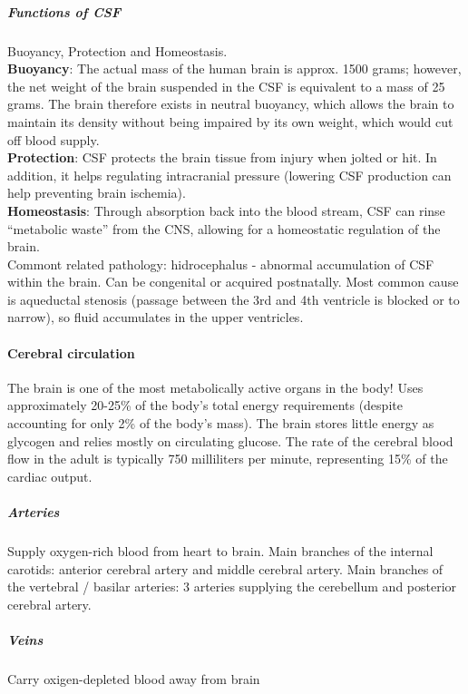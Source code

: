 \documentclass[12pt,article,oneside,a4paper]{memoir}
\begin{document}
\subparagraph{Functions of CSF} Buoyancy, Protection and Homeostasis. \\
\textbf{Buoyancy}: The actual mass of the human brain is approx. 1500 grams; however, the net weight of the brain suspended in the CSF is equivalent to a mass of 25 grams. The brain therefore exists in neutral buoyancy, which allows the brain to maintain its density without being impaired by its own weight, which would cut off blood supply. \\
\textbf{Protection}: CSF protects the brain tissue from injury when jolted or hit. In addition, it helps regulating intracranial pressure (lowering CSF production can help preventing brain ischemia). \\
\textbf{Homeostasis}: Through absorption back into the blood stream, CSF can rinse “metabolic waste” from the CNS, allowing for a homeostatic regulation of the brain. \\
Commont related pathology: hidrocephalus - abnormal accumulation of CSF within the brain. Can be congenital or acquired postnatally. Most common cause is aqueductal stenosis (passage between the 3rd and 4th ventricle is blocked or to narrow), so fluid accumulates in the upper ventricles.

\paragraph{Cerebral circulation}
The brain is one of the most metabolically active organs in the body! Uses approximately 20-25\% of the body’s total energy requirements (despite accounting for only 2\% of the body’s mass). The brain stores little energy as glycogen and relies mostly on circulating glucose. The rate of the cerebral blood flow in the adult is typically 750 milliliters per minute, representing 15\% of the cardiac output.

\subparagraph{Arteries} Supply oxygen-rich blood from heart to brain. Main branches of the internal carotids: anterior cerebral artery and middle cerebral artery. Main branches of the vertebral / basilar arteries: 3 arteries supplying the cerebellum and posterior cerebral artery.
\subparagraph{Veins} Carry oxigen-depleted blood away from brain
\end{document}
